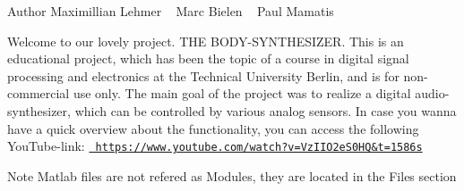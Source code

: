 \label{index_md_mainpage}%
%


\begin{DoxyAuthor}{Author}
Maximillian Lehmer ~\newline
 Marc Bielen ~\newline
 Paul Mamatis
\end{DoxyAuthor}
Welcome to our lovely project. THE BODY-\/\+SYNTHESIZER. This is an educational project, which has been the topic of a course in digital signal processing and electronics at the Technical University Berlin, and is for non-\/commercial use only. The main goal of the project was to realize a digital audio-\/synthesizer, which can be controlled by various analog sensors. In case you wanna have a quick overview about the functionality, you can access the following You\+Tube-\/link\+: \href{https://www.youtube.com/watch?v=VzIIO2eS0HQ&t=1586s}{\texttt{ https\+://www.\+youtube.\+com/watch?v=\+Vz\+IIO2e\+S0\+HQ\&t=1586s}}

\begin{DoxyNote}{Note}
Matlab files are not refered as Modules, they are located in the Files section 
\end{DoxyNote}
